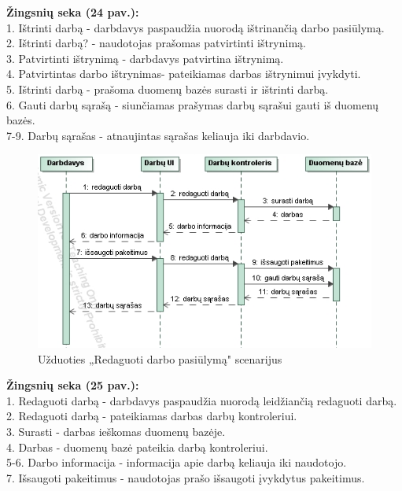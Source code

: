 \documentclass{VUMIFPSkursinis}
\begin{document}
	\textbf{Žingsnių seka (24 pav.):}\\
	1. Ištrinti darbą - darbdavys paspaudžia nuorodą ištrinančią darbo pasiūlymą. \\
	2. Ištrinti darbą? - naudotojas prašomas patvirtinti ištrynimą. \\
	3. Patvirtinti ištrynimą - darbdavys patvirtina ištrynimą. \\
	4. Patvirtintas darbo ištrynimas- pateikiamas darbas ištrynimui įvykdyti. \\
	5. Ištrinti darbą - prašoma duomenų bazės surasti ir ištrinti darbą.\\
	6. Gauti darbų sąrašą - siunčiamas prašymas darbų sąrašui gauti iš duomenų bazės. \\
	7-9. Darbų sąrašas - atnaujintas sąrašas keliauja iki darbdavio. 
%
\begin{figure}[H]
\centering
\includegraphics[width=\linewidth, frame]{img/seku(redaguotidarba).png}
\caption{Užduoties „Redaguoti darbo pasiūlymą" scenarijus}
\end{figure}
	\textbf{Žingsnių seka (25 pav.):}\\
	1. Redaguoti darbą - darbdavys paspaudžia nuorodą leidžiančią redaguoti darbą. \\
	2. Redaguoti darbą - pateikiamas darbas darbų kontroleriui.\\
	3. Surasti - darbas ieškomas duomenų bazėje.\\
	4. Darbas - duomenų bazė pateikia darbą kontroleriui.\\
	5-6. Darbo informacija - informacija apie darbą keliauja iki naudotojo.\\
	7. Išsaugoti pakeitimus - naudotojas prašo išsaugoti įvykdytus pakeitimus. \\
\end{document}
